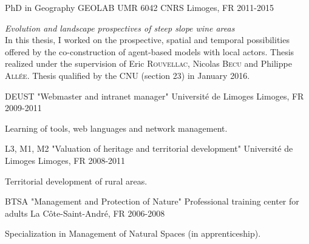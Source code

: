 

\begin{cventries}

  \cventry
    {PhD in Geography} %
    {GEOLAB UMR 6042 CNRS} %
    {Limoges, FR} %
    {2011-2015} %
    {
      \begin{cvitems} %
        \emph{Evolution and landscape prospectives of steep slope wine areas}\\
        In this thesis, I worked on the prospective, spatial and temporal possibilities offered by the co-construction of agent-based models with local actors. Thesis realized under the supervision of Eric \textsc{Rouvellac}, Nicolas \textsc{Becu} and Philippe \textsc{Allée}. Thesis qualified by the CNU (section 23) in January 2016.
      \end{cvitems}
    }

\cventry
  {DEUST {\normalfont "Webmaster and intranet manager"}} %
  {Université de Limoges} %
  {Limoges, FR} %
  {2009-2011} %
  {
    \begin{cvitems} %
      Learning of tools, web languages and network management.
    \end{cvitems}
  }

\cventry
  {L3, M1, M2 "Valuation of heritage and territorial development"} %
  {Université de Limoges} %
  {Limoges, FR} %
  {2008-2011} %
  {
    \begin{cvitems} %
      Territorial development of rural areas.
    \end{cvitems}
  }

\cventry
  {BTSA "Management and Protection of Nature"} %
  {Professional training center for adults} %
  {La Côte-Saint-André, FR} %
  {2006-2008} %
  {
    \begin{cvitems} %
      Specialization in Management of Natural Spaces (in apprenticeship).
    \end{cvitems}
  }


\end{cventries}
